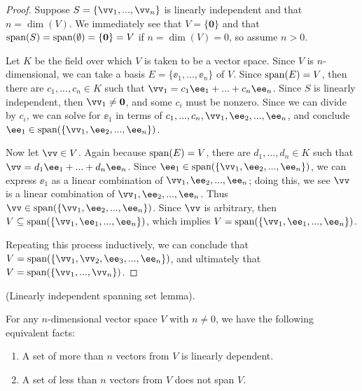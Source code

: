 \begin{proof}

   Suppose $S = \{\vv_1, ..., \vv_n\}$ is linearly independent and that $n = \dim(V)$. We immediately see that $V = \{\mathbf{0}\}$ and that $\text{span}(S) = \text{span}(\emptyset) = \{\mathbf{0}\} = V$ if $n = \dim(V) = 0$, so assume $n > 0$.
   
   Let $K$ be the field over which $V$ is taken to be a vector space. Since $V$ is $n$-dimensional, we can take a basis $E = \{\ee_1, ..., \ee_n\}$ of $V$. Since $\text{span}(E) = V$, then there are $c_1, ..., c_n \in K$ such that ${\vv_1 = c_1 \ee_1 + ... + c_n \ee_n}$. Since $S$ is linearly independent, then $\vv_1 \neq \mathbf{0}$, and some $c_i$ must be nonzero. Since we can divide by $c_i$, we can solve for $\ee_1$ in terms of $c_1, ..., c_n, \vv_1, \ee_2, ..., \ee_n$, and conclude $\ee_1 \in \spann(\{\vv_1, \ee_2, ..., \ee_n\})$. 
   
   Now let $\vv \in V$. Again because $\text{span}(E) = V$, there are $d_1, ..., d_n \in K$ such that $\vv = d_1 \ee_1 + ... + d_n \ee_n$. Since $\ee_1 \in \spann(\{\vv_1, \ee_2, ..., \ee_n\})$, we can express $\ee_1$ as a linear combination of $\vv_1, \ee_2, ..., \ee_n$; doing this, we see $\vv$ is a linear combination of $\vv_1, \ee_2, ..., \ee_n$. Thus $\vv \in \spann(\{\vv_1, \ee_2, ..., \ee_n\})$. Since $\vv$ is arbitrary, then ${V \subseteq \spann(\{\vv_1, \ee_1, ..., \ee_n\})}$, which implies $V = \spann(\{\vv_1, \ee_1, ..., \ee_n\})$.

    Repeating this process inductively, we can conclude that $V = \spann(\{\vv_1, \vv_2, \ee_3, ..., \ee_n\})$, and ultimately that $V = \spann(\{\vv_1, ..., \vv_n\})$. 
\end{proof}

\begin{lemma}
\label{ch::lin_alg::lemma::dimension}
    (Linearly independent spanning set lemma). 
    
    For any $n$-dimensional vector space $V$ with $n \neq 0$, we have the following equivalent facts:
    
    \begin{enumerate}
        \item A set of more than $n$ vectors from $V$ is linearly dependent.
        \item A set of less than $n$ vectors from $V$ does not span $V$.
    \end{enumerate}
\end{lemma}

